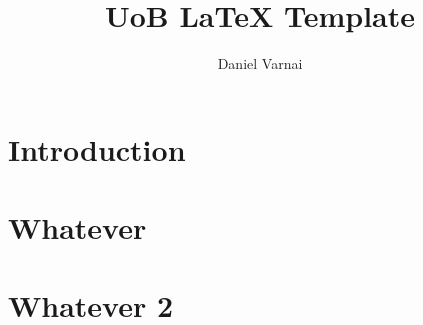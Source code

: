 \documentclass[a4paper,12pt]{article}
\title{UoB LaTeX Template}
\author{Daniel Varnai}
\let\stdsection\section
\renewcommand\section{\newpage\stdsection}
\begin{document}


\thispagestyle{empty} 
\clearpage
\tableofcontents
\thispagestyle{empty} 
\clearpage
\setcounter{page}{1}

\section{Introduction}
\lipsum[2-4]
 
\section{Whatever}
\lipsum[5-6]

\section{Whatever 2}
\lipsum[5-6]
 

 
 
\end{document}
